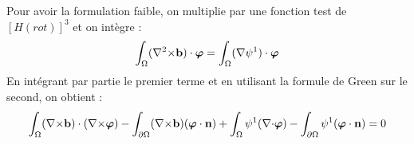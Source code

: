Pour avoir la formulation faible, on multiplie par une fonction test de $[H(rot)]^3$ et on intègre :
\[ \int_\Omega ({\nabla^2\times} \mathbf{b})\cdot\bm{\varphi} = \int_\Omega ({\nabla}\psi^1)\cdot\bm{\varphi} \]
En intégrant par partie le premier terme et en utilisant la formule de Green sur le second, on obtient :
\begin{equation} \label{fvbcurl}
\int_\Omega ({\nabla\times} \mathbf{b})\cdot({\nabla\times}\bm{\varphi}) - \int_{\partial\Omega} ({\nabla\times} \mathbf{b})(\bm{\varphi}\cdot \mathbf{n}) + \int_\Omega \psi^1({\nabla\cdot}\bm{\varphi}) - \int_{\partial\Omega} \psi^1(\bm{\varphi}\cdot \mathbf{n}) = 0
\end{equation}



